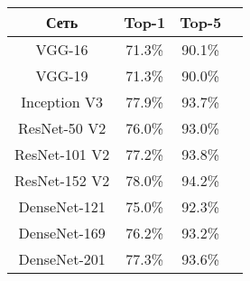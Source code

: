 \begin{table}[H]
  \centering
  \begin{tabular}{|c|c|c|c|}
    \hline    
    Сеть          & Top-1   & Top-5     \\
    \hline
    VGG-16        & 71.3\%	& 90.1\%    \\
    \hline
    VGG-19        & 71.3\%	& 90.0\%    \\
    \hline
    Inception V3  & 77.9\%	& 93.7\%    \\
    \hline
    ResNet-50 V2  & 76.0\%	& 93.0\%    \\
    \hline
    ResNet-101 V2 & 77.2\%	& 93.8\%    \\
    \hline
    ResNet-152 V2 & 78.0\%	& 94.2\%    \\
    \hline
    DenseNet-121  & 75.0\%	& 92.3\%    \\
    \hline
    DenseNet-169  & 76.2\%	& 93.2\%    \\
    \hline
    DenseNet-201  & 77.3\%	& 93.6\%    \\
    \hline
  \end{tabular}
\end{table}